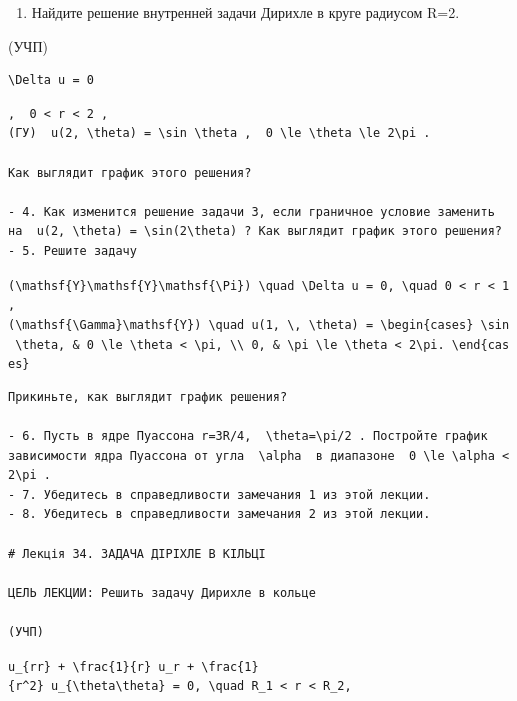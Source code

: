 \documentclass[
  ukrainian,
]{article}
\providecommand{\tightlist}{%
  \setlength{\itemsep}{0pt}\setlength{\parskip}{0pt}}
\begin{document}
\begin{enumerate}
\def\labelenumi{\arabic{enumi}.}
\setcounter{enumi}{2}
\tightlist
\item
  Найдите решение внутренней задачи Дирихле в круге радиусом R=2.
\end{enumerate}

(УЧП)

\begin{verbatim}
\Delta u = 0
\end{verbatim}

\begin{verbatim}
,  0 < r < 2 ,  
(ГУ)  u(2, \theta) = \sin \theta ,  0 \le \theta \le 2\pi .

Как выглядит график этого решения?

- 4. Как изменится решение задачи 3, если граничное условие заменить на  u(2, \theta) = \sin(2\theta) ? Как выглядит график этого решения?
- 5. Решите задачу
\end{verbatim}

\texttt{(\textbackslash{}mathsf\{Y\}\textbackslash{}mathsf\{Y\}\textbackslash{}mathsf\{\textbackslash{}Pi\})\ \textbackslash{}quad\ \textbackslash{}Delta\ u\ =\ 0,\ \textbackslash{}quad\ 0\ \textless{}\ r\ \textless{}\ 1,}
\texttt{(\textbackslash{}mathsf\{\textbackslash{}Gamma\}\textbackslash{}mathsf\{Y\})\ \textbackslash{}quad\ u(1,\ \textbackslash{},\ \textbackslash{}theta)\ =\ \textbackslash{}begin\{cases\}\ \textbackslash{}sin\ \textbackslash{}theta,\ \&\ 0\ \textbackslash{}le\ \textbackslash{}theta\ \textless{}\ \textbackslash{}pi,\ \textbackslash{}\textbackslash{}\ 0,\ \&\ \textbackslash{}pi\ \textbackslash{}le\ \textbackslash{}theta\ \textless{}\ 2\textbackslash{}pi.\ \textbackslash{}end\{cases\}}

\begin{verbatim}
Прикиньте, как выглядит график решения?

- 6. Пусть в ядре Пуассона r=3R/4,  \theta=\pi/2 . Постройте график зависимости ядра Пуассона от угла  \alpha  в диапазоне  0 \le \alpha < 2\pi .
- 7. Убедитесь в справедливости замечания 1 из этой лекции.
- 8. Убедитесь в справедливости замечания 2 из этой лекции.

# Лекція 34. ЗАДАЧА ДІРІХЛЕ В КІЛЬЦІ

ЦЕЛЬ ЛЕКЦИИ: Решить задачу Дирихле в кольце

(УЧП)
\end{verbatim}

\texttt{u\_\{rr\}\ +\ \textbackslash{}frac\{1\}\{r\}\ u\_r\ +\ \textbackslash{}frac\{1\}\{r\^{}2\}\ u\_\{\textbackslash{}theta\textbackslash{}theta\}\ =\ 0,\ \textbackslash{}quad\ R\_1\ \textless{}\ r\ \textless{}\ R\_2,}
\end{document}
